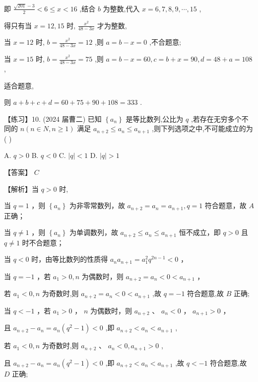 \documentclass[10pt]{article}
\newcommand*\circled[1]{\tikz[baseline=(char.base)]{\node[shape=circle,draw,inner sep=1.5pt] (char) {\small #1};}}
\begin{document}
即 \(\frac{\sqrt{201} - 3}{2} < 6 \leq  x < {16}\) ,结合 \(b\) 为整数,代入 \(x = 6,7,8,9,\cdots ,{15}\) ,

得只有当 \(x = {12},{15}\) 时, \(\frac{{x}^{2}}{{48} - {3x}}\) 才为整数,

当 \(x = {12}\) 时, \(b = \frac{{x}^{2}}{{48} - {3x}} = {12}\) ,则 \(a = b - x = 0\) ,不合题意;

当 \(x = {15}\) 时, \(b = \frac{{x}^{2}}{{48} - {3x}} = {75}\) ,则 \(a = b - x = {60},c = b + x = {90},d = {48} + a = {108}\) ,

适合题意,

则 \(a + b + c + d = {60} + {75} + {90} + {108} = {333}\) .

【练习】10. (2024 届曹二) 已知 \(\left\{  {a}_{n}\right\}\) 是等比数列,公比为 \(q\) ,若存在无穷多个不同的 \(n\left( {n \in  N,n \geq  1}\right)\) 满足 \({a}_{n + 2} \leq  {a}_{n} \leq  {a}_{n + 1}\) ,则下列选项之中,不可能成立的为 ( )

A. \(q > 0\) B. \(q < 0\) C. \(\left| q\right|  < 1\) D. \(\left| q\right|  > 1\)

【答案】 \(C\)

【解析】当 \(q > 0\) 时,

 \circled{1} 当 \(q = 1\) ，则 \(\left\{  {a}_{n}\right\}\) 为非零常数列，故 \({a}_{n + 2} = {a}_{n} = {a}_{n + 1},q = 1\) 符合题意，故 \(A\) 正确；

 \circled{2} 当 \(q \neq  1\) ，则 \(\left\{  {a}_{n}\right\}\) 为单调数列，故 \({a}_{n + 2} \leq  {a}_{n} \leq  {a}_{n + 1}\) 恒不成立，即 \(q > 0\) 且 \(q \neq  1\) 时不合题意；

当 \(q < 0\) 时，由等比数列的性质得 \({a}_{n}{a}_{n + 1} = {a}_{1}^{2}{q}^{{2n} - 1} < 0\) ，

 \circled{1}  当 \(q =  - 1\) ，若 \({a}_{1} > 0,n\) 为偶数时，则 \({a}_{n + 2} = {a}_{n} < 0 < {a}_{n + 1}\) ，

若 \({a}_{1} < 0,n\) 为奇数时,则 \({a}_{n + 2} = {a}_{n} < 0 < {a}_{n + 1}\) ,故 \(q =  - 1\) 符合题意,故 \(B\) 正确;

 \circled{2}  当 \(q <  - 1\) ，若 \({a}_{1} > 0\) ， \(n\) 为偶数时，则 \({a}_{n + 2}\) 、 \({a}_{n} < 0\) ， \({a}_{n + 1} > 0\) ，

且 \({a}_{n + 2} - {a}_{n} = {a}_{n}\left( {{q}^{2} - 1}\right)  < 0\) ,即 \({a}_{n + 2} < {a}_{n} < {a}_{n + 1}\) ,

若 \({a}_{1} < 0,n\) 为奇数时,则 \({a}_{n + 2}\text{ 、 }{a}_{n} < 0,{a}_{n + 1} > 0\) ,

且 \({a}_{n + 2} - {a}_{n} = {a}_{n}\left( {{q}^{2} - 1}\right)  < 0\) ,即 \({a}_{n + 2} < {a}_{n} < {a}_{n + 1}\) ,故 \(q <  - 1\) 符合题意,故 \(D\) 正确;
\end{document}
